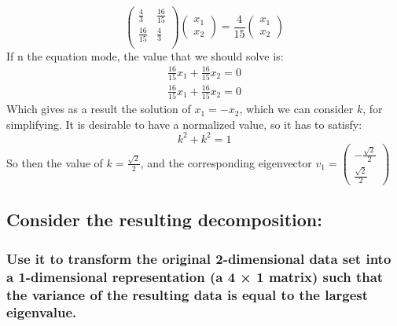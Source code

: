 \documentclass[12pt]{article}
\begin{document}
\begin{enumerate}
\begin{itemize}
        \begin{equation}
            \begin{pmatrix}
             \frac{4}{3} & \frac{16}{15} \\
              \frac{16}{15} &\frac{4}{3} \\
            \end{pmatrix}
            \begin{pmatrix}
                x_1 \\ x_2
            \end{pmatrix} = \frac{4}{15}
            \begin{pmatrix}
                x_1 \\ x_2
            \end{pmatrix}
        \end{equation}
        If n the equation mode, the value that we should solve is:
        \begin{equation}
            \begin{split}
                \frac{16}{15}x_1+\frac{16}{15}x_2=0 \\
                \frac{16}{15}x_1+\frac{16}{15}x_2=0
            \end{split}
        \end{equation}
        Which gives as a result the solution of $x_1=-x_2$, which we can consider $k$, for simplifying. It is desirable to have a normalized value, so it has to satisfy:
        \begin{equation}
            k^2+k^2=1
        \end{equation}
        So then the value of $k=\frac{\sqrt{2}}{2}$, and the corresponding eigenvector $v_1=\begin{pmatrix}-\frac{\sqrt{2}}{2} \\ \frac{\sqrt{2}}{2}\end{pmatrix}$
    \end{itemize}
    
    
\end{enumerate}

\subsection{Consider the resulting decomposition:}

\subsubsection{Use it to transform the original 2-dimensional data set into a 1-dimensional representation (a 4 × 1 matrix) such that the variance of the resulting data is equal to the largest eigenvalue.}
\end{document}
